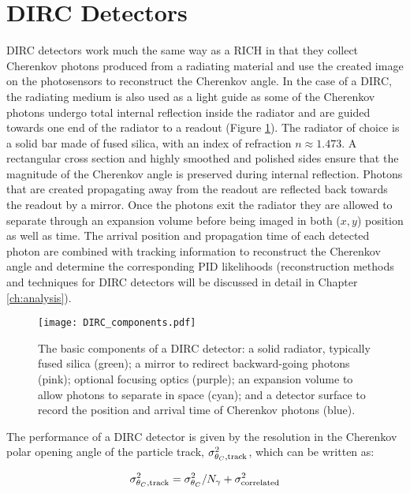 \section{DIRC Detectors}
DIRC detectors work much the same way as a RICH in that they collect Cherenkov photons produced from a radiating material and use the created image on the photosensors to reconstruct the Cherenkov angle. In the case of a DIRC, the radiating medium is also used as a light guide as some of the Cherenkov photons undergo total internal reflection inside the radiator and are guided towards one end of the radiator to a readout (Figure \ref{fig:dircbasics}). The radiator of choice is a solid bar made of fused silica, with an index of refraction $n \approx 1.473$. A rectangular cross section and highly smoothed and polished sides ensure that the magnitude of the Cherenkov angle is preserved during internal reflection. Photons that are created propagating away from the readout are reflected back towards the readout by a mirror. Once the photons exit the radiator they are allowed to separate through an expansion volume before being imaged in both ($x, y$) position as well as time. The arrival position and propagation time of each detected photon are combined with tracking information to reconstruct the Cherenkov angle and determine the corresponding PID likelihoods (reconstruction methods and techniques for DIRC detectors will be discussed in detail in Chapter \ref{ch:analysis}).

\begin{figure}[!htb]
	\centering
	\texttt{[image: DIRC\_components.pdf]}
	\caption{The basic components of a DIRC detector: a solid radiator, typically fused silica (green); a mirror to redirect backward-going photons (pink); optional focusing optics (purple); an expansion volume to allow photons to separate in space (cyan); and a detector surface to record the position and arrival time of Cherenkov photons (blue).}
	\label{fig:dircbasics}
\end{figure}

The performance of a DIRC detector is given by the resolution in the Cherenkov polar opening angle of the particle track, $\sigma_{\theta_{C},\text{track}}^2$, which can be written as:

\begin{equation}
	\sigma_{\theta_{C},\text{track}}^2 = \sigma_{\theta_{C}}^2 / N_{\gamma} + \sigma_{\text{correlated}}^2
	\label{eq:performance}
\end{equation}

